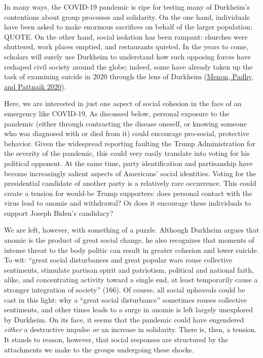 \documentclass[
  12pt,
]{article}
\begin{document}
In many ways, the COVID-19 pandemic is ripe for testing many of Durkheim's contentions about group processes and solidarity. On the one hand, individuals have been asked to make enormous sacrifices on behalf of the larger population; QUOTE. On the other hand, social isolation has been rampant: churches were shuttered, work places emptied, and restaurants quieted. In the years to come, scholars will surely use Durkheim to understand how such opposing forces have reshaped civil society around the globe; indeed, some have already taken up the task of examining suicide in 2020 through the lens of Durkheim (\protect\hyperlink{ref-Menon2020}{Menon, Padhy, and Pattnaik 2020}).

Here, we are interested in just one aspect of social cohesion in the face of an emergency like COVID-19. As discussed below, personal exposure to the pandemic (either through contracting the disease oneself, or knowing someone who was diagnosed with or died from it) could encourage pro-social, protective behavior. Given the widespread reporting faulting the Trump Administration for the severity of the pandemic, this could very easily translate into voting for his political opponent. At the same time, party identification and partisanship have become increasingly salient aspects of Americans' social identities. Voting for the presidential candidate of another party is a relatively rare occurrence. This could create a tension for would-be Trump supporters: does personal contact with the virus lead to anomie and withdrawal? Or does it encourage these individuals to support Joseph Biden's candidacy?

We are left, however, with something of a puzzle. Although Durkheim argues that anomie is the product of great social change, he also recognizes that moments of intense threat to the body politic can result in greater cohesion and lower suicide. To wit: ``great social disturbances and great popular wars rouse collective sentiments, stimulate partisan spirit and patriotism, political and national faith, alike, and concentrating activity toward a single end, at least temporarily cause a stronger integration of society'' (166). Of course, all social upheavals could be cast in this light: why a ``great social disturbance'' sometimes rouses collective sentiments, and other times leads to a surge in anomie is left largely unexplored by Durkheim. On its face, it seems that the pandemic could have engendered \emph{either} a destructive impulse \emph{or} an increase in solidarity. There is, then, a tension. It stands to reason, however, that social responses are structured by the attachments we make to the groups undergoing these shocks.
\end{document}

